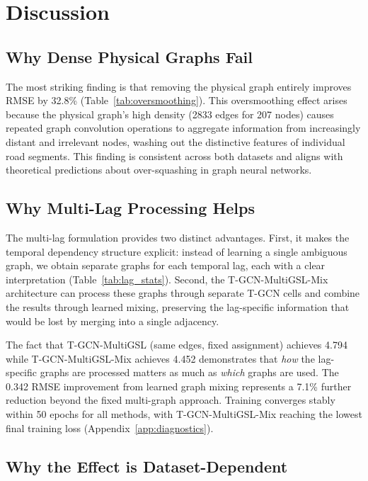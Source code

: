 \section{Discussion}\label{sec:discussion}

\subsection{Why Dense Physical Graphs Fail}

The most striking finding is that removing the physical graph entirely improves RMSE by 32.8\% (Table~\ref{tab:oversmoothing}). This oversmoothing effect arises because the physical graph's high density (2833 edges for 207 nodes) causes repeated graph convolution operations to aggregate information from increasingly distant and irrelevant nodes, washing out the distinctive features of individual road segments. This finding is consistent across both datasets and aligns with theoretical predictions about over-squashing in graph neural networks.

\subsection{Why Multi-Lag Processing Helps}

The multi-lag formulation provides two distinct advantages. First, it makes the temporal dependency structure explicit: instead of learning a single ambiguous graph, we obtain separate graphs for each temporal lag, each with a clear interpretation (Table~\ref{tab:lag_stats}). Second, the T-GCN-MultiGSL-Mix architecture can process these graphs through separate T-GCN cells and combine the results through learned mixing, preserving the lag-specific information that would be lost by merging into a single adjacency.

The fact that T-GCN-MultiGSL (same edges, fixed assignment) achieves 4.794 while T-GCN-MultiGSL-Mix achieves 4.452 demonstrates that \textit{how} the lag-specific graphs are processed matters as much as \textit{which} graphs are used. The 0.342 RMSE improvement from learned graph mixing represents a 7.1\% further reduction beyond the fixed multi-graph approach. Training converges stably within 50 epochs for all methods, with T-GCN-MultiGSL-Mix reaching the lowest final training loss (Appendix~\ref{app:diagnostics}).

\subsection{Why the Effect is Dataset-Dependent}

